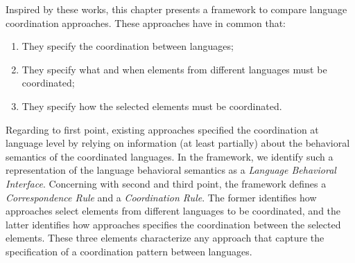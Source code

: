 Inspired by these works, this chapter presents a framework to compare language coordination approaches. These approaches have in common that:
\begin{enumerate}
	\item They specify the coordination between languages;
	\item They specify what and when elements from different languages must be coordinated;
	\item They specify how the selected elements must be coordinated.  
\end{enumerate}	
Regarding to first point, existing approaches specified the coordination at language level by relying on information (at least partially) about the behavioral semantics of the coordinated languages. In the framework, we identify such a representation of the language behavioral semantics as a \emph{Language Behavioral Interface}. Concerning with second and third point, the framework defines a \emph{Correspondence Rule} and a \emph{Coordination Rule}. The former identifies how approaches select elements from different languages to be coordinated, and the latter identifies how approaches specifies the coordination between the selected elements. These three elements characterize any approach that capture the specification of a coordination pattern between languages. 

